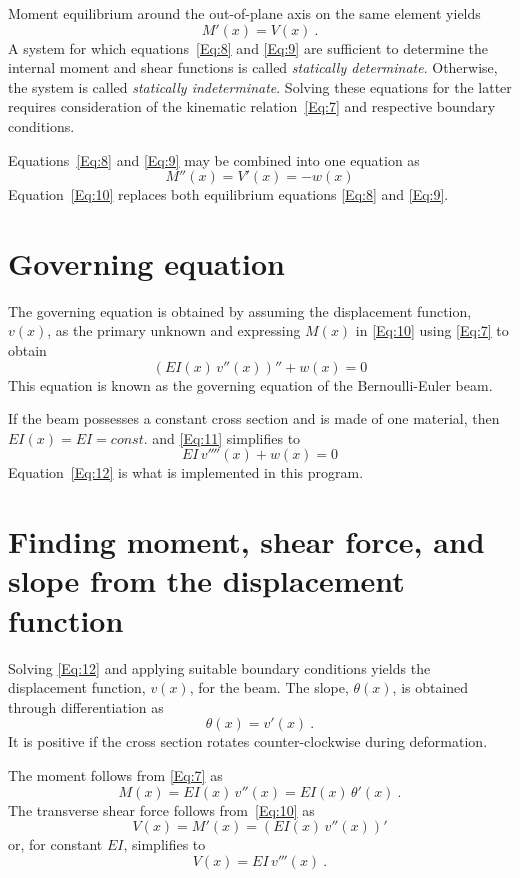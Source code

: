 \documentclass[11pt, oneside]{article}   	%
\begin{document}
Moment equilibrium around the out-of-plane axis on the same element yields
\begin{equation}
	M'(x) = V(x) ~.
	\label{Eq:9}
\end{equation}
A system for which equations~\eqref{Eq:8} and \eqref{Eq:9} are sufficient to determine the internal moment and shear functions is called \emph{statically determinate}. Otherwise, the system is called \emph{statically indeterminate}. Solving these equations for the latter requires consideration of the kinematic relation~\eqref{Eq:7} and respective boundary conditions.

Equations~\eqref{Eq:8} and \eqref{Eq:9} may be combined into one equation as
\begin{equation}
	M''(x) = V'(x)=-w(x)
	\label{Eq:10}
\end{equation}
Equation~\eqref{Eq:10} replaces both equilibrium equations \eqref{Eq:8} and \eqref{Eq:9}.

\section{Governing equation}
The governing equation is obtained by assuming the displacement function, $v(x)$, as the primary unknown and expressing $M(x)$ in \eqref{Eq:10} using \eqref{Eq:7} to obtain
\begin{equation}
	\left( EI(x)\,v''(x) \right)'' + w(x) = 0
	\label{Eq:11}
\end{equation}
This equation is known as the governing equation of the Bernoulli-Euler beam.

If the beam possesses a constant cross section and is made of one material, then $EI(x)=EI=const.$ and
\eqref{Eq:11} simplifies to
\begin{equation}
	EI\,v''''(x) + w(x) = 0
	\label{Eq:12}
\end{equation}
Equation~\eqref{Eq:12} is what is implemented in this program.

\section{Finding moment, shear force, and slope from the displacement function}
Solving \eqref{Eq:12} and applying suitable boundary conditions yields the displacement function, $v(x)$, for the beam.
The slope, $\theta(x)$, is obtained through differentiation as
\begin{equation}
	\theta(x) = v'(x) ~.
	\label{Eq:13}
\end{equation}
It is positive if the cross section rotates counter-clockwise during deformation.

The moment follows from \eqref{Eq:7} as
\begin{equation}
	M(x) = EI(x)\, v''(x) = EI(x)\, \theta'(x) ~.
	\label{Eq:14}
\end{equation}
The transverse shear force follows from~\eqref{Eq:10} as
\begin{equation}
	V(x) = M'(x) = \left( EI(x)\, v''(x) \right)'
	\label{Eq:15}
\end{equation}
or, for constant $EI$, simplifies to
\begin{equation}
	V(x) = EI\, v'''(x) ~.
	\label{Eq:16}
\end{equation}
\end{document}
